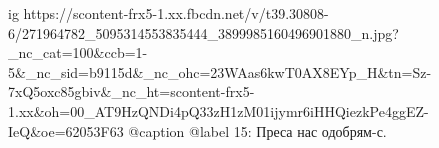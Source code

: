  
 
 
 
 

\ifcmt
  ig https://scontent-frx5-1.xx.fbcdn.net/v/t39.30808-6/271964782_5095314553835444_3899985160496901880_n.jpg?_nc_cat=100&ccb=1-5&_nc_sid=b9115d&_nc_ohc=23WAas6kwT0AX8EYp_H&tn=Sz-7xQ5oxc85gbiv&_nc_ht=scontent-frx5-1.xx&oh=00_AT9HzQNDi4pQ33zH1zM01ijymr6iHHQiezkPe4ggEZ-IeQ&oe=62053F63
  @caption @label 15: Преса нас одобрям-с.
\fi
